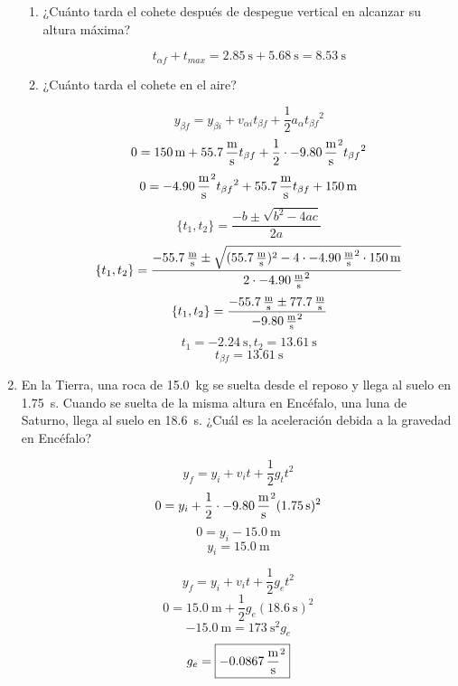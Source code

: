 \documentclass[Física - Práctica.root.tex]{subfiles}
\begin{document}
\begin{enumerate}
\begin{enumerate}
          \item ¿Cuánto tarda el cohete después de despegue vertical en alcanzar su altura máxima?

                \[t_{\alpha f}+t_{max}=\SI{2.85}{\second}+\SI{5,68}{\second}=\boxed{\SI{8,53}{\second}}\]

                \newpage

          \item ¿Cuánto tarda el cohete en el aire?

                \[y_{\beta f}=y_{\beta i}+v_{\alpha i}t_{\beta f}+\frac{1}{2}a_\alpha{t_{\beta f}}^2\]
                \[0=\SI{150}{\meter}+\SI{55,7}{\meter\over\second}t_{\beta f}+\frac{1}{2}\cdot\SI{-9,80}{\meter\over\second\squared}{t_{\beta f}}^2\]
                \[0=\SI{-4,90}{\meter\over\second\squared}{t_{\beta f}}^2+\SI{55,7}{\meter\over\second}t_{\beta f}+\SI{150}{\meter}\]
                \[\{t_1,t_2\}=\frac{-b\pm\sqrt{b^2-4ac}}{2a}\]
                \[\{t_1,t_2\}=\frac{\SI{-55,7}{\meter\over\second}\pm\sqrt{(\SI{55,7}{\meter\over\second})^2-4\cdot\SI{-4,90}{\meter\over\second\squared}\cdot\SI{150}{\meter}}}{2\cdot\SI{-4,90}{\meter\over\second\squared}}\]
                \[\{t_1,t_2\}=\frac{\SI{-55,7}{\meter\over\second}\pm\SI{77,7}{\meter\over\second}}{\SI{-9,80}{\meter\over\second\squared}}\]
                \[t_1=\SI{-2,24}{\second},t_2=\SI{13,61}{\second}\]
                \[t_{\beta f}=\boxed{\SI{13,61}{\second}}\]
        \end{enumerate}

  \item En la Tierra, una roca de \SI{15,0}{\kilogram} se suelta desde el reposo y llega al suelo en \SI{1,75}{\second}. Cuando se suelta de la misma altura en Encéfalo, una luna de Saturno, llega al suelo en \SI{18,6}{\second}. ¿Cuál es la aceleración debida a la gravedad en Encéfalo?

        \[y_f=y_i+v_it+\frac{1}{2}g_tt^2\]
        \[0=y_i+\frac{1}{2}\cdot\SI{-9,80}{\meter\over\second\squared}(\SI{1,75}{\second})^2\]
        \[0=y_i-\SI{15,0}{\meter}\]
        \[y_i=\SI{15,0}{\meter}\]

        \[y_f=y_i+v_it+\frac{1}{2}g_et^2\]
        \[0=\SI{15,0}{\meter}+\frac{1}{2}g_e(\SI{18,6}{\second})^2\]
        \[\SI{-15,0}{\meter}=\SI{173}{\second\squared}g_e\]
        \[g_e=\boxed{\SI{-0,0867}{\meter\over\second\squared}}\]
\end{enumerate}
\end{document}
